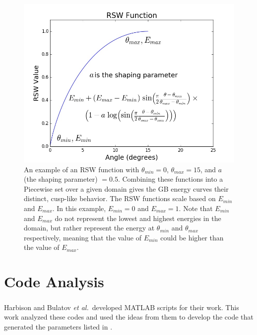 \documentclass[twoside,senior]{BYUPhys}
\begin{document}
\begin{figure}[ht!]
 \centering
 \includegraphics[scale=0.5]{Images/rsw}
 \caption[The general form of an RSW function.]{\label{fig:RSW}An example of an RSW function with $\theta_{min} = 0$\textdegree{}, $\theta_{max} = 15$\textdegree{}, and $a$ (the shaping parameter) $= 0.5$.  Combining these functions into a Piecewise set over a given domain gives the GB energy curves their distinct, cusp-like behavior.  The RSW functions scale based on $E_{min}$ and $E_{max}$.  In this example, $E_{min} = 0$ and $E_{max} = 1$. Note that $E_{min}$ and $E_{max}$ do not represent the lowest and highest energies in the domain, but rather represent the energy at $\theta_{min}$ and $\theta_{max}$ respectively, meaning that the value of $E_{min}$ could be higher than the value of $E_{max}$.}
\end{figure}



\section{Code Analysis\label{methods:code}}
Harbison\cite{harbison2015} and Bulatov \emph{et al.}\cite{bulatov2014}\ developed MATLAB\textsuperscript{\textregistered} scripts for their work.  This work analyzed these codes and used the ideas from them to develop the code that generated the parameters listed in .
\end{document}
